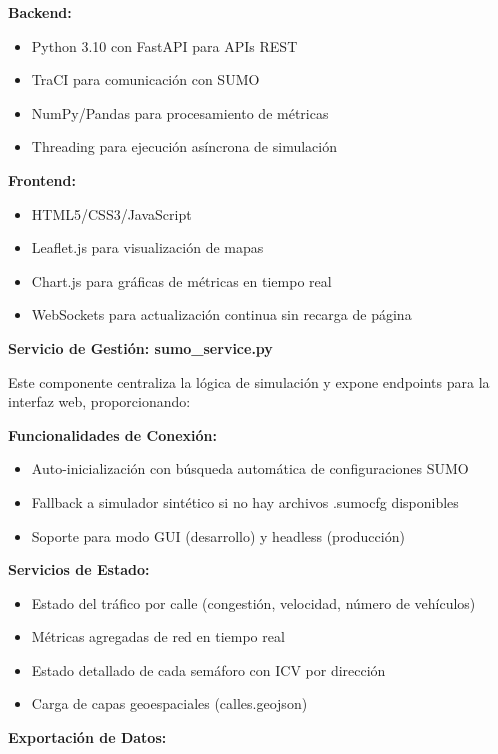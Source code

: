 \documentclass[12pt,a4paper,oneside]{report}
\begin{document}
\textbf{Backend:}

\begin{itemize}
\item
  Python 3.10 con FastAPI para APIs REST
\item
  TraCI para comunicación con SUMO
\item
  NumPy/Pandas para procesamiento de métricas
\item
  Threading para ejecución asíncrona de simulación
\end{itemize}

\textbf{Frontend:}

\begin{itemize}
\item
  HTML5/CSS3/JavaScript
\item
  Leaflet.js para visualización de mapas
\item
  Chart.js para gráficas de métricas en tiempo real
\item
  WebSockets para actualización continua sin recarga de página
\end{itemize}

\textbf{Servicio de Gestión: sumo\_service.py}

Este componente centraliza la lógica de simulación y expone endpoints para la interfaz web, proporcionando:

\textbf{Funcionalidades de Conexión:}

\begin{itemize}
\item
  Auto-inicialización con búsqueda automática de configuraciones SUMO
\item
  Fallback a simulador sintético si no hay archivos .sumocfg disponibles
\item
  Soporte para modo GUI (desarrollo) y headless (producción)
\end{itemize}

\textbf{Servicios de Estado:}

\begin{itemize}
\item
  Estado del tráfico por calle (congestión, velocidad, número de vehículos)
\item
  Métricas agregadas de red en tiempo real
\item
  Estado detallado de cada semáforo con ICV por dirección
\item
  Carga de capas geoespaciales (calles.geojson)
\end{itemize}

\textbf{Exportación de Datos:}
\end{document}
